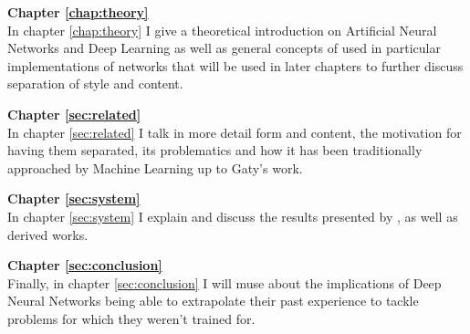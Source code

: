 \textbf{Chapter \ref{chap:theory}} \\[0.2em]
In chapter \ref{chap:theory} I give a theoretical introduction on Artificial Neural Networks and Deep Learning as well as general concepts of used in particular implementations of networks that will be used in later chapters to further discuss separation of style and content.

\textbf{Chapter \ref{sec:related}} \\[0.2em]
In chapter \ref{sec:related} I talk in more detail form and content, the motivation for having them separated, its problematics and how it has been traditionally approached by Machine Learning up to Gaty's work.

\textbf{Chapter \ref{sec:system}} \\[0.2em]
In chapter \ref{sec:system} I explain and discuss the results presented by \citet{Gatys2015}, as well as derived works.

\textbf{Chapter \ref{sec:conclusion}} \\[0.2em]
Finally, in chapter \ref{sec:conclusion} I will muse about the implications of Deep Neural Networks being able to extrapolate their past experience to tackle problems for which they weren't trained for.
